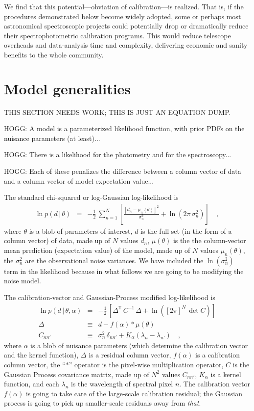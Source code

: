 \documentclass[iop,numberedappendix]{emulateapj}
\newcommand{\transpose}[1]{{#1}^{\!\mathsf T}}
\newcommand{\given}{\,|\,}
\begin{document}
We find that this potential---obviation of calibration---is realized.
That is, if the procedures demonstrated below become widely adopted,
some or perhaps most astronomical spectroscopic projects could
potentially drop or dramatically reduce their spectrophotometric
calibration programs.
This would reduce telescope overheads and data-analysis time and
complexity, delivering economic and sanity benefits to the whole
community.

\section{Model generalities}

THIS SECTION NEEDS WORK; THIS IS JUST AN EQUATION DUMP.

HOGG: A model is a parameterized likelihood function, with prior PDFs on the nuisance parameters (at least)...

HOGG: There is a likelihood for the photometry and for the spectroscopy...

HOGG: Each of these penalizes the difference between a column vector of data and a column vector of model expectation value...

The standard chi-squared or log-Gaussian log-likelihood is
\begin{eqnarray}
\ln p(d\given\theta) &=& -\frac{1}{2}\,\sum_{n=1}^N \left[\frac{[d_n - \mu_n(\theta)]^2}{\sigma_n^2} + \ln(2\pi\,\sigma_n^2) \right]
\quad ,
\end{eqnarray}
where $\theta$ is a blob of parameters of interest,
$d$ is the full set (in the form of a column vector) of data,
made up of $N$ values $d_n$,
$\mu(\theta)$ is the the column-vector mean prediction (expectation value) of the model,
made up of $N$ values $\mu_n(\theta)$,
the $\sigma_n^2$ are the observational noise variances.
We have included the $\ln(\sigma_n^2)$ term in the likelihood because
in what follows we are going to be modifying the noise model.

The calibration-vector and Gaussian-Process modified log-likelihood is
\begin{eqnarray}
\ln p(d\given\theta,\alpha) &=& -\frac{1}{2}\,\left[\transpose{\Delta}\,C^{-1}\,\Delta + \ln([2\pi]^N\,\det{C}) \right]
\\
\Delta &\equiv& d - f(\alpha)\ast\mu(\theta)
\\
C_{nn'} &\equiv& \sigma_n^2\,\delta_{nn'} + K_\alpha(\lambda_n - \lambda_{n'})
\quad ,
\end{eqnarray}
where $\alpha$ is a blob of nuisance parameters
(which determine the calibration vector and the kernel function),
$\Delta$ is a residual column vector,
$f(\alpha)$ is a calibration column vector,
the ``$\ast$'' operator is the pixel-wise multiplication operator,
$C$ is the Gaussian Process covariance matrix,
made up of $N^2$ values $C_{nn'}$,
$K_\alpha$ is a kernel function,
and each $\lambda_n$ is the wavelength of spectral pixel $n$.
The calibration vector $f(\alpha)$ is going to take care of the
large-scale calibration residual; the Gaussian process is going to
pick up smaller-scale residuals away from \emph{that}.
\end{document}
